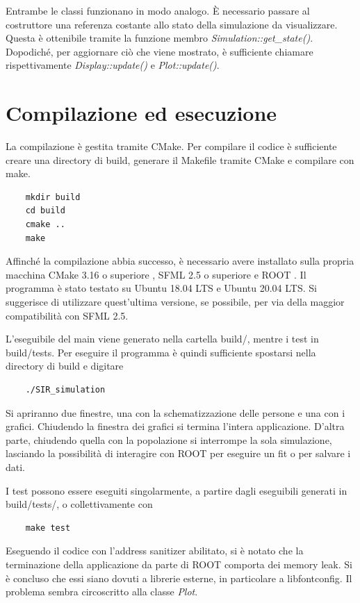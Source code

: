 \documentclass[a4paper,10pt,twocolumn]{article}
\begin{document}
Entrambe le classi funzionano in modo analogo. È necessario passare al costruttore una referenza costante allo stato della simulazione da visualizzare. Questa è ottenibile tramite la funzione membro \emph{Simulation::get\_state()}. Dopodiché, per aggiornare ciò che viene mostrato, è sufficiente chiamare rispettivamente \emph{Display::update()} e \emph{Plot::update()}.


\section{Compilazione ed esecuzione}
La compilazione è gestita tramite CMake. Per compilare il codice è sufficiente creare una directory di build, generare il Makefile tramite CMake e compilare con make.

\begin{verbatim}
    mkdir build
    cd build
    cmake ..
    make
\end{verbatim}

Affinché la compilazione abbia successo, è necessario avere installato sulla propria macchina CMake 3.16 o superiore \cite{bib:CMake}, SFML 2.5 o superiore \cite{bib:SFML} e ROOT \cite{bib:ROOT}. Il programma è stato testato su Ubuntu 18.04 LTS e Ubuntu 20.04 LTS. Si suggerisce di utilizzare quest'ultima versione, se possibile, per via della maggior compatibilità con SFML 2.5.

L'eseguibile del main viene generato nella cartella build/, mentre i test in build/tests. Per eseguire il programma è quindi sufficiente spostarsi nella directory di build e digitare

\begin{verbatim}
    ./SIR_simulation
\end{verbatim}

Si apriranno due finestre, una con la schematizzazione delle persone e una con i grafici. Chiudendo la finestra dei grafici si termina l'intera applicazione. D'altra parte, chiudendo quella con la popolazione si interrompe la sola simulazione, lasciando la possibilità di interagire con ROOT per eseguire un fit o per salvare i dati.

I test possono essere eseguiti singolarmente, a partire dagli eseguibili generati in build/tests/, o collettivamente con

\begin{verbatim}
    make test
\end{verbatim}

Eseguendo il codice con l'address sanitizer abilitato, si è notato che la terminazione della applicazione da parte di ROOT comporta dei memory leak. Si è concluso che essi siano dovuti a librerie esterne, in particolare a libfontconfig. Il problema sembra circoscritto alla classe \emph{Plot}.
\end{document}
